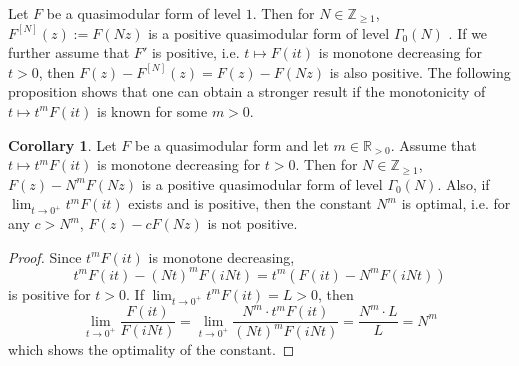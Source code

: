 \documentclass[10pt,reqno]{amsproc}
\newcommand{\bR}{\mathbb{R}}
\newcommand{\bZ}{\mathbb{Z}}
\newcommand{\1}{\mathds{1}}	%
\theoremstyle{definition}
\newtheorem{corollary}[theorem]{Corollary}
\theoremstyle{remark}
\begin{document}
Let $F$ be a quasimodular form of level $1$.
Then for $N \in \bZ_{\ge 1}$, $F^{[N]}(z) := F(Nz)$ is a positive quasimodular form of level $\Gamma_0(N)$ \cite[Proposition 3.9]{lee2024algebraic}.
If we further assume that $F'$ is positive, i.e. $t \mapsto F(it)$ is monotone decreasing for $t > 0$, then $F(z) - F^{[N]}(z) = F(z) - F(Nz)$ is also positive.
The following proposition shows that one can obtain a stronger result if the monotonicity of $t \mapsto t^m F(it)$ is known for some $m > 0$.

\begin{corollary}
    \label{cor:polymod_posdif}
    Let $F$ be a quasimodular form and let $m \in \bR_{> 0}$.
    Assume that $t \mapsto t^m F(it)$ is monotone decreasing for $t > 0$.
    Then for $N \in \bZ_{\ge 1}$, $F(z) - N^{m} F(Nz)$ is a positive quasimodular form of level $\Gamma_0(N)$.
    Also, if $\lim_{t \to 0^+} t^m F(it)$ exists and is positive, then the constant $N^{m}$ is optimal, i.e. for any $c > N^{m}$, $F(z) - c F(Nz)$ is not positive.
\end{corollary}
\begin{proof}
    Since $t^{m} F(it)$ is monotone decreasing,
    \[t^m F(it) - (Nt)^m F(iNt) = t^m (F(it) - N^m F(iNt))\]
    is positive for $t > 0$.
    If $\lim_{t \to 0^+} t^m F(it) = L > 0$, then
    \[
    \lim_{t \to 0^+} \frac{F(it)}{F(iNt)} = \lim_{t \to 0^+} \frac{N^m \cdot t^m F(it)}{(Nt)^m F(iNt)} = \frac{N^m \cdot L}{L} = N^m
    \]
    which shows the optimality of the constant.
\end{proof}
\end{document}
